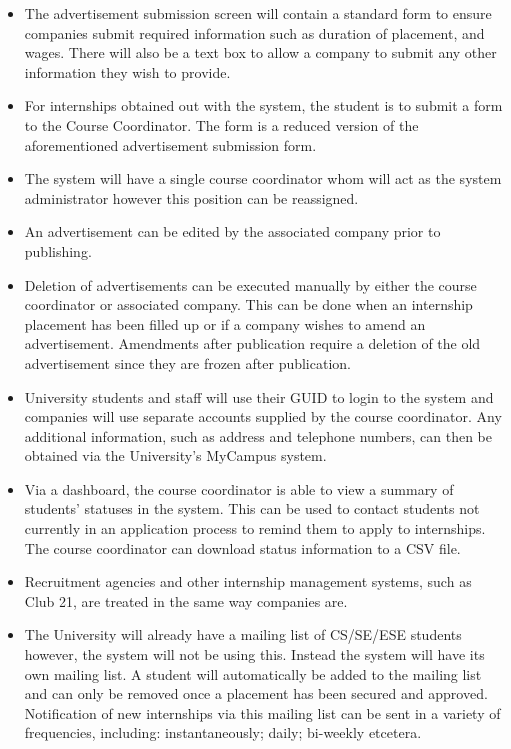 \documentclass{l3deliverable}
\begin{document}
\begin{itemize}

\item The advertisement submission screen will contain a standard form to
ensure companies submit required information such as duration of placement, and
wages. There will also be a text box to allow a company to submit any other
information they wish to provide.

\item For internships obtained out with the system, the student is to submit
a form to the Course Coordinator. The form is a reduced version of the
aforementioned advertisement submission form.

\item The system will have a single course coordinator whom will act as
the system administrator however this position can be reassigned.

\item An advertisement can be edited by the associated company prior to
publishing.

\item Deletion of advertisements can be executed manually by either the course
coordinator or associated company. This can be done when an internship placement
has been filled up or if a company wishes to amend an advertisement. Amendments
after publication require a deletion of the old advertisement since they are
frozen after publication.

\item University students and staff will use their GUID to login to the system
and companies will use separate accounts supplied by the course coordinator.
Any additional information, such as address and telephone numbers, can then
be obtained via the University's MyCampus system.

\item Via a dashboard, the course coordinator is able to view a summary of
students' statuses in the system. This can be used to contact students not
currently in an application process to remind them to apply to internships. The
course coordinator can download status information to a CSV file.

\item Recruitment agencies and other internship management systems, such as
Club 21, are treated in the same way companies are.

\item The University will already have a mailing list of CS/SE/ESE students
however, the system will not be using this. Instead the system will have its
own mailing list. A student will automatically be added to the mailing list
and can only be removed once a placement has been secured and approved.
Notification of new internships via this mailing list can be sent in a variety
of frequencies, including: instantaneously; daily; bi-weekly etcetera.


\end{itemize}
\end{document}
